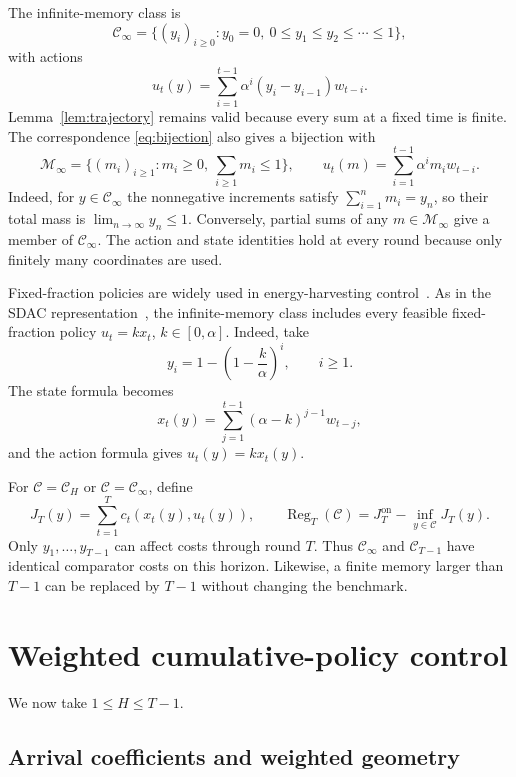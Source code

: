 \documentclass[11pt]{article}
\newcommand{\CH}{\mathcal C_H}
\newcommand{\CI}{\mathcal C_\infty}
\newcommand{\Reg}{\operatorname{Reg}}
\begin{document}
The infinite-memory class is
\begin{equation}
\label{eq:infinite-class}
\CI
=
\{(y_i)_{i\ge0}:y_0=0,\ 0\le y_1\le y_2\le\cdots\le1\},
\end{equation}
with actions
\[
u_t(y)=\sum_{i=1}^{t-1}\alpha^i(y_i-y_{i-1})w_{t-i}.
\]
Lemma~\ref{lem:trajectory} remains valid because every sum at a
fixed time is finite. The correspondence \eqref{eq:bijection}
also gives a bijection with
\[
\mathcal M_\infty
=\{(m_i)_{i\ge1}:m_i\ge0,\ \sum_{i\ge1}m_i\le1\},
\qquad
u_t(m)=\sum_{i=1}^{t-1}\alpha^im_iw_{t-i}.
\]
Indeed, for $y\in\CI$ the nonnegative increments satisfy
$\sum_{i=1}^n m_i=y_n$, so their total mass is
$\lim_{n\to\infty}y_n\le1$. Conversely, partial sums of any
$m\in\mathcal M_\infty$ give a member of $\CI$.
The action and state identities hold at every round because
only finitely many coordinates are used.

Fixed-fraction policies are widely used in energy-harvesting
control~\cite{shaviv2016universally,arafa2018online}.
As in the SDAC representation~\cite{asgari2026sdac}, the
infinite-memory class includes every feasible fixed-fraction
policy $u_t=kx_t$, $k\in[0,\alpha]$. Indeed, take
\[
y_i=1-\left(1-\frac{k}{\alpha}\right)^i,
\qquad i\ge1.
\]
The state formula becomes
\[
x_t(y)=\sum_{j=1}^{t-1}(\alpha-k)^{j-1}w_{t-j},
\]
and the action formula gives $u_t(y)=kx_t(y)$.

For $\mathcal C=\CH$ or $\mathcal C=\CI$, define
\begin{equation}
\label{eq:regret}
J_T(y)=\sum_{t=1}^T c_t(x_t(y),u_t(y)),
\qquad
\Reg_T(\mathcal C)
=
J_T^{\mathrm{on}}-\inf_{y\in\mathcal C}J_T(y).
\end{equation}
Only $y_1,\ldots,y_{T-1}$ can affect costs through round $T$.
Thus $\CI$ and $\mathcal C_{T-1}$ have identical comparator
costs on this horizon. Likewise, a finite memory larger than
$T-1$ can be replaced by $T-1$ without changing the benchmark.

\section{Weighted cumulative-policy control}
\label{sec:algorithm}

We now take $1\le H\le T-1$.

\subsection{Arrival coefficients and weighted geometry}
\end{document}
